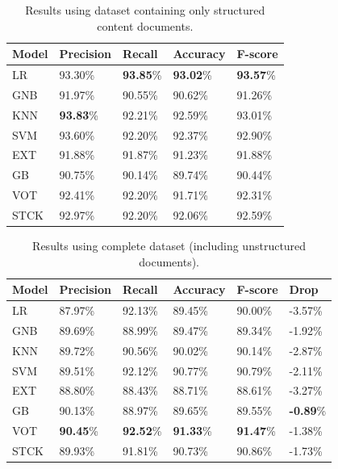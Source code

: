 \begin{table}[h]
\centering
\caption{Results using dataset containing only structured content documents.}
\label{tab:result}
\begin{tabular}{| l | l | l | l | l |}
\hline
Model & Precision & Recall & Accuracy & F-score \\ \hline
LR   & 93.30\% & \textbf{93.85}\% & \textbf{93.02}\% & \textbf{93.57}\% \\
GNB  & 91.97\% & 90.55\% & 90.62\% & 91.26\% \\
KNN  & \textbf{93.83}\% & 92.21\% & 92.59\% & 93.01\% \\
SVM  & 93.60\% & 92.20\% & 92.37\% & 92.90\% \\
EXT  & 91.88\% & 91.87\% & 91.23\% & 91.88\% \\
GB   & 90.75\% & 90.14\% & 89.74\% & 90.44\% \\
VOT  & 92.41\% & 92.20\% & 91.71\% & 92.31\% \\
STCK & 92.97\% & 92.20\% & 92.06\% & 92.59\% \\
\hline
\end{tabular}
\end{table}

\begin{table}[h]
\centering
\caption{Results using complete dataset (including unstructured documents).}
\label{tab:resultnoise}
\begin{tabular}{| l | l | l | l | l | l |}
\hline
Model & Precision & Recall & Accuracy & F-score & Drop \\ \hline
LR   & 87.97\% & 92.13\% & 89.45\% & 90.00\% & -3.57\% \\
GNB  & 89.69\% & 88.99\% & 89.47\% & 89.34\% & -1.92\% \\
KNN  & 89.72\% & 90.56\% & 90.02\% & 90.14\% & -2.87\% \\
SVM  & 89.51\% & 92.12\% & 90.77\% & 90.79\% & -2.11\% \\
EXT  & 88.80\% & 88.43\% & 88.71\% & 88.61\% & -3.27\% \\
GB   & 90.13\% & 88.97\% & 89.65\% & 89.55\% & \textbf{-0.89}\% \\
VOT  & \textbf{90.45}\% & \textbf{92.52}\% & \textbf{91.33}\% & \textbf{91.47}\% & -1.38\% \\
STCK & 89.93\% & 91.81\% & 90.73\% & 90.86\% & -1.73\% \\
\hline
\end{tabular}
\end{table}

